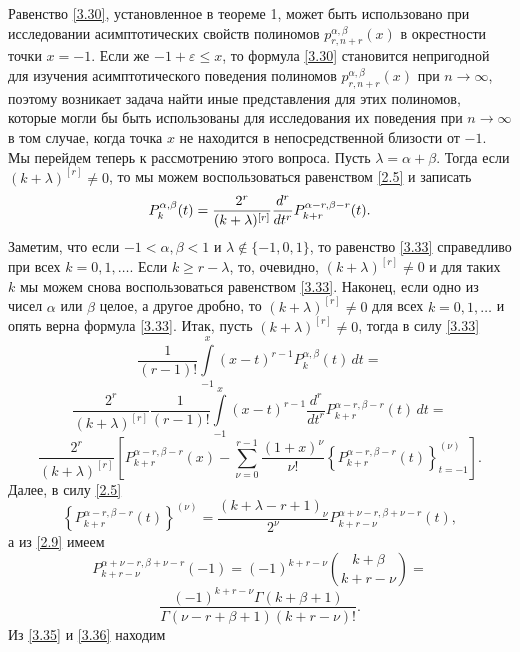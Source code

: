 Равенство \eqref{3.30}, установленное в теореме 1, может быть использовано при исследовании асимптотических свойств полиномов $p_{r,n+r}^{\alpha,\beta}(x)$ в окрестности точки $x=-1$. Если же $-1+\varepsilon\le x$, то формула  \eqref{3.30} становится непригодной для изучения асимптотического  поведения полиномов  $p_{r,n+r}^{\alpha,\beta}(x)$ при $n\to\infty$, поэтому возникает задача найти иные представления для этих полиномов, которые могли бы быть использованы для исследования их поведения при $n\to\infty$ в том случае, когда точка $x$ не находится в непосредственной близости от $-1$. Мы перейдем теперь к рассмотрению этого вопроса. Пусть $\lambda=\alpha+\beta$. Тогда если $(k+\lambda)^{[r]}\neq0$,
то мы можем воспользоваться равенством \eqref{2.5} и записать
\begin{equation}\label{3.33}
P^{\alpha,\beta}_k(t)={2^r \over (k+\lambda )^{[r]}}\frac{d^r}{dt^r}P_{k+r}^{\alpha-r,\beta-r}(t).
\end{equation}
Заметим, что если $-1<\alpha,\beta<1$ и $\lambda\notin\{-1,0,1\}$, то
 равенство \eqref{3.33} справедливо при всех
$k=0,1,\ldots$. Если  $k\ge r-\lambda$, то, очевидно,
$(k+\lambda)^{[r]}\neq0$ и для таких $k$ мы
можем снова воспользоваться равенством \eqref{3.33}. Наконец, если одно из чисел $\alpha$ или $\beta$ целое, а другое дробно, то
$(k+\lambda)^{[r]}\neq0$ для всех $k=0,1,\ldots$ и опять верна формула \eqref{3.33}. Итак, пусть $(k+\lambda)^{[r]}\neq0$, тогда в силу  \eqref{3.33}
$$
\frac{1}{(r-1)!}\int\limits^x_{-1}(x-t)^{r-1}P_k^{\alpha,\beta}(t)\,dt=
$$
$$
\frac{2^r}{(k+\lambda)^{[r]}}\frac{1}{(r-1)!}\int\limits^x_{-1}(x-t)^{r-1}
\frac{d^r}{dt^r}P_{k+r}^{\alpha-r,\beta-r}(t)\,dt=
$$
\begin{equation}\label{3.34}
\frac{2^r}{(k+\lambda)^{[r]}}\left[P_{k+r}^{\alpha-r,\beta-r}(x)-\sum^{r-1}_{\nu=0}
\frac{(1+x)^\nu}{\nu!}\left\{P_{k+r}^{\alpha-r,\beta-r}(t)
\right\}_{t=-1}^{(\nu)}\right].
\end{equation}
 Далее, в силу \eqref{2.5}
 \begin{equation}\label{3.35}
\left\{P_{k+r}^{\alpha-r,\beta-r}(t)\right\}^{(\nu)}=
\frac{(k+\lambda-r+1)_\nu}{2^\nu}P_{k+r-\nu}^{\alpha+\nu-r,\beta+\nu-r}(t),
\end{equation}
а из \eqref{2.9} имеем
$$P_{k+r-\nu}^{\alpha+\nu-r,\beta+\nu-r}(-1)=(-1)^{k+r-\nu}{k+\beta\choose k+r-\nu}=$$
\begin{equation}\label{3.36}
\frac{(-1)^{k+r-\nu}\Gamma(k+\beta+1)}{\Gamma(\nu-r+\beta+1)(k+r-\nu)!}.
\end{equation}
Из \eqref{3.35}  и \eqref{3.36} находим
